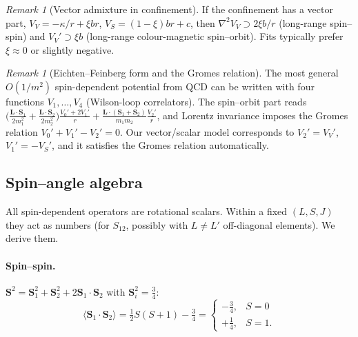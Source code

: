 \documentclass[11pt,a4paper]{article}
\numberwithin{equation}{section}
\theoremstyle{definition}
\theoremstyle{plain}
\theoremstyle{remark}
\newtheorem{remark}[definition]{Remark}
\numberwithin{algorithm}{section}
\newcommand{\vL}{\bm L}
\newcommand{\vS}{\bm S}
\begin{document}
\begin{remark}[Vector admixture in confinement]
If the confinement has a vector part, $V_V=-\kappa/r+\xi br$, $V_S=(1-\xi)br+c$, then $\nabla^2V_V\supset2\xi b/r$ (long-range spin--spin) and $V_V'\supset\xi b$ (long-range colour-magnetic spin--orbit). Fits typically prefer $\xi\approx0$ or slightly negative.
\end{remark}

\begin{remark}[Eichten--Feinberg form and the Gromes relation]
The most general $O(1/m^2)$ spin-dependent potential from QCD can be written with four functions $V_1,\dots,V_4$ (Wilson-loop correlators). The spin--orbit part reads
$\big(\frac{\vL\cdot\vS_1}{2m_1^2}+\frac{\vL\cdot\vS_2}{2m_2^2}\big)\frac{V_0'+2V_1'}{r}+\frac{\vL\cdot(\vS_1+\vS_2)}{m_1m_2}\frac{V_2'}{r}$,
and Lorentz invariance imposes the Gromes relation $V_0'+V_1'-V_2'=0$. Our vector/scalar model corresponds to $V_2'=V_V'$, $V_1'=-V_S'$, and it satisfies the Gromes relation automatically.
\end{remark}

\subsection{Spin--angle algebra}\label{sec:spinalg}
All spin-dependent operators are rotational scalars. Within a fixed $(L,S,J)$ they act as numbers (for $S_{12}$, possibly with $L\neq L'$ off-diagonal elements). We derive them.

\paragraph{Spin--spin.} $\vS^2=\vS_1^2+\vS_2^2+2\vS_1\!\cdot\!\vS_2$ with $\vS_i^2=\frac34$:
\begin{equation}
\langle\vS_1\!\cdot\!\vS_2\rangle=\tfrac12S(S+1)-\tfrac34=\begin{cases}-\tfrac34,&S=0\\ +\tfrac14,&S=1.\end{cases}
\end{equation}
\end{document}
